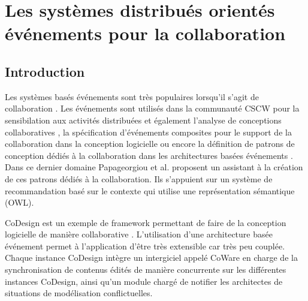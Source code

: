 
\section{Les systèmes distribués orientés événements pour la collaboration}

	\subsection{Introduction}
Les systèmes basés événements sont très populaires lorsqu'il s'agit de 
collaboration \cite{Helmer2011}. Les événements sont utilisés dans la communauté  
\gls{CSCW} pour la sensibilation aux activités distribuées \cite{Cai2014a} et 
également l'analyse de conceptions collaboratives \cite{Bang2017}, la spécification 
d'événements composites pour le support de la collaboration 
dans la conception logicielle \cite{Yuan2002} ou encore la définition de patrons 
de conception dédiés à la collaboration dans les architectures basées événements 
\cite{Verginadis2009}. Dans ce dernier domaine 
Papageorgiou et al. \cite{Papageorgiou2011} proposent un assistant à la 
création de ces patrons dédiés à la collaboration. Ils s'appuient sur un système de 
recommandation basé sur le contexte qui utilise une représentation sémantique 
(\gls{OWL}).

CoDesign est un exemple de \gls{framework} permettant de faire de la 
conception logicielle de manière collaborative \cite{Bang2010}. L'utilisation d'une 
architecture basée événement permet à l'application d'être très extensible car très 
peu couplée. Chaque instance CoDesign intègre un intergiciel appelé CoWare en 
charge de la synchronisation de contenus édités de manière concurrente sur les 
différentes instances CoDesign, ainsi qu'un module chargé de notifier les 
architectes de situations de modélisation conflictuelles. 


